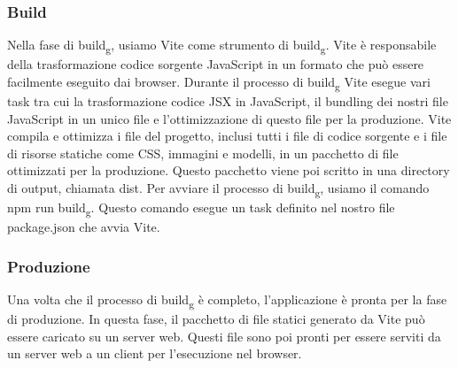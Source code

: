 \subsubsection{Build}
Nella fase di build\textsubscript{g}, usiamo Vite come strumento di build\textsubscript{g}. 
Vite è responsabile della trasformazione codice sorgente JavaScript in un formato che può essere facilmente eseguito dai browser. 
Durante il processo di build\textsubscript{g} Vite esegue vari task tra cui la trasformazione codice JSX in JavaScript,
il bundling dei nostri file JavaScript in un unico file e l'ottimizzazione di questo file per la produzione.
Vite compila e ottimizza i file del progetto, inclusi tutti i file di codice sorgente e i file di risorse statiche come CSS, immagini e modelli, 
in un pacchetto di file ottimizzati per la produzione. 
Questo pacchetto viene poi scritto in una directory di output, chiamata dist.
Per avviare il processo di build\textsubscript{g}, usiamo il comando npm run build\textsubscript{g}. Questo comando esegue un task definito nel nostro file package.json che avvia 
Vite.
\subsubsection{Produzione}
Una volta che il processo di build\textsubscript{g} è completo, l'applicazione è pronta per la fase di produzione. 
In questa fase, il pacchetto di file statici generato da Vite può essere caricato su un server web. 
Questi file sono poi pronti per essere serviti da un server web a un client per l'esecuzione nel browser.